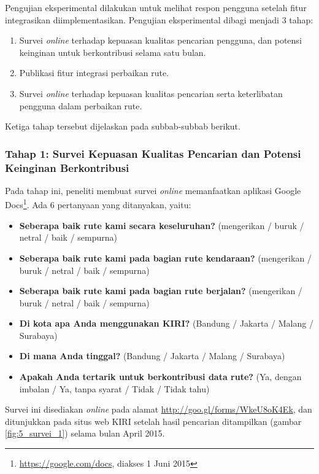 Pengujian eksperimental dilakukan untuk melihat respon pengguna setelah fitur integrasikan diimplementasikan. Pengujian eksperimental dibagi menjadi 3 tahap:

\begin{enumerate}
	\item Survei \textit{online} terhadap kepuasan kualitas pencarian pengguna, dan potensi keinginan untuk berkontribusi selama satu bulan.
	\item Publikasi fitur integrasi perbaikan rute.
	\item Survei \textit{online} terhadap kepuasan kualitas pencarian serta keterlibatan pengguna dalam perbaikan rute.
\end{enumerate}

Ketiga tahap tersebut dijelaskan pada subbab-subbab berikut.

\subsubsection{Tahap 1: Survei Kepuasan Kualitas Pencarian dan Potensi Keinginan Berkontribusi}

Pada tahap ini, peneliti membuat survei \textit{online} memanfaatkan aplikasi Google Docs\footnote{\url{https://google.com/docs}, diakses 1 Juni 2015}. Ada 6 pertanyaan yang ditanyakan, yaitu:

\begin{itemize}
	\item \textbf{Seberapa baik rute kami secara keseluruhan?} (mengerikan / buruk / netral / baik / sempurna)
	\item \textbf{Seberapa baik rute kami pada bagian rute kendaraan?} (mengerikan / buruk / netral / baik / sempurna)
	\item \textbf{Seberapa baik rute kami pada bagian rute berjalan?} (mengerikan / buruk / netral / baik / sempurna)
	\item \textbf{Di kota apa Anda menggunakan KIRI?} (Bandung / Jakarta / Malang / Surabaya)
	\item \textbf{Di mana Anda tinggal?} (Bandung / Jakarta / Malang / Surabaya)
	\item \textbf{Apakah Anda tertarik untuk berkontribusi data rute?} (Ya, dengan imbalan / Ya, tanpa syarat / Tidak / Tidak tahu)
\end{itemize}

Survei ini disediakan \textit{online} pada alamat \url{http://goo.gl/forms/WkeU8oK4Ek}, dan ditunjukkan pada situs web KIRI setelah hasil pencarian ditampilkan (gambar \ref{fig:5_survei_1}) selama bulan April 2015.

